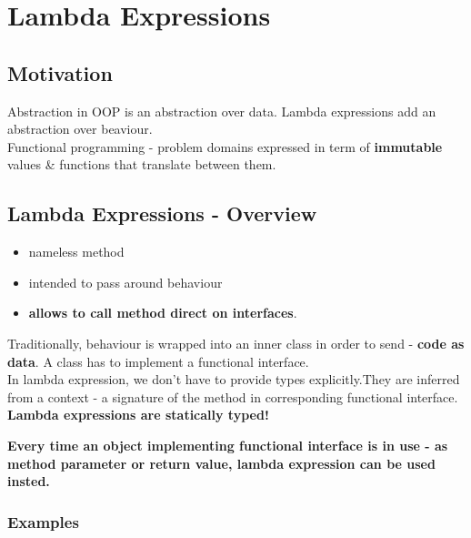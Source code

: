 \documentclass{report}
\begin{document}
\chapter{Lambda Expressions}
\section{Motivation}
Abstraction in OOP is an abstraction over data. Lambda expressions add an abstraction over beaviour.\\
Functional programming - problem domains expressed in term of \textbf{immutable} values \& functions that translate between them. 

\section{Lambda Expressions - Overview}
\begin{itemize}
	\item nameless method
	\item intended to pass around behaviour
	\item \textbf{allows to call method direct on interfaces}.
\end{itemize}
Traditionally, behaviour is wrapped into an inner class in order to send - \textbf{code as data}. A class has to implement a functional interface.\\
In lambda expression, we don't have to provide types explicitly.They are inferred from a context - a signature of the method in corresponding functional interface.\\
\textbf{Lambda expressions are statically typed!}
\par \textbf{Every time an object implementing functional interface is in use - as method parameter or return value, lambda expression can be used insted.}

\subsection*{Examples}
\end{document}
